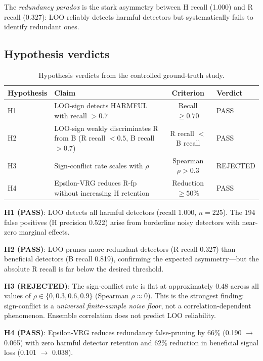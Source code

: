 The \emph{redundancy paradox} is the stark asymmetry between H recall (1.000) and R recall (0.327): LOO reliably detects harmful detectors but systematically fails to identify redundant ones.

\subsection{Hypothesis verdicts}

\begin{table}[h]
\centering
\caption{Hypothesis verdicts from the controlled ground-truth study.}
\label{tab:hypothesis_verdicts}
\begin{tabular}{llcl}
\toprule
Hypothesis & Claim & Criterion & Verdict \\
\midrule
H1 & LOO-sign detects HARMFUL with recall $> 0.7$ & Recall $\geq 0.70$ & PASS \\
H2 & LOO-sign weakly discriminates R from B (R recall $< 0.5$, B recall $> 0.7$) & R recall $<$ B recall & PASS \\
H3 & Sign-conflict rate scales with $\rho$ & Spearman $\rho > 0.3$ & REJECTED \\
H4 & Epsilon-VRG reduces R-fp without increasing H retention & Reduction $\geq 50\%$ & PASS \\
\bottomrule
\end{tabular}
\end{table}

\textbf{H1 (PASS)}: LOO detects all harmful detectors (recall 1.000, $n=225$). The 194 false positives (H precision 0.522) arise from borderline noisy detectors with near-zero marginal effects.

\textbf{H2 (PASS)}: LOO prunes more redundant detectors (R recall 0.327) than beneficial detectors (B recall 0.819), confirming the expected asymmetry---but the absolute R recall is far below the desired threshold.

\textbf{H3 (REJECTED)}: The sign-conflict rate is flat at approximately 0.48 across all values of $\rho \in \{0, 0.3, 0.6, 0.9\}$ (Spearman $\rho \approx 0$). This is the strongest finding: sign-conflict is a \emph{universal finite-sample noise floor}, not a correlation-dependent phenomenon. Ensemble correlation does not predict LOO reliability.

\textbf{H4 (PASS)}: Epsilon-VRG reduces redundancy false-pruning by 66\% (0.190 $\to$ 0.065) with zero harmful detector retention and 62\% reduction in beneficial signal loss (0.101 $\to$ 0.038).

